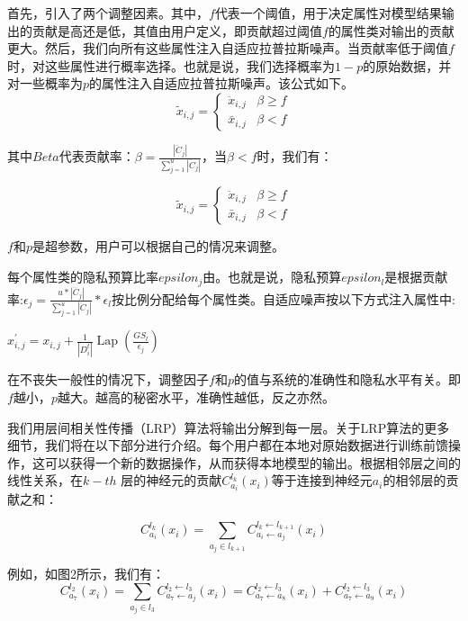 首先，引入了两个调整因素。其中，$f$代表一个阈值，用于决定属性对模型结果输出的贡献是高还是低，其值由用户定义，即贡献超过阈值$f$的属性类对输出的贡献更大。然后，我们向所有这些属性注入自适应拉普拉斯噪声。当贡献率低于阈值$f$时，对这些属性进行概率选择。也就是说，我们选择概率为$1-p$的原始数据，并对一些概率为$p$的属性注入自适应拉普拉斯噪声。该公式如下。
$$
\tilde{x}_{i, j}=\left\{\begin{array}{ll}
\ddot{x}_{i, j} & \beta \geq f \\
\bar{x}_{i, j} & \beta<f
\end{array}\right.
$$

其中$Beta$代表贡献率：$\beta=\frac{\left|\ddot{C}_{j}\right|}{\sum_{j=1}^{u}\left|\ddot{C}_{j}\right|}$，当$\beta<f$时，我们有：

$$\tilde{x}_{i, j}=\left\{\begin{array}{ll}\ddot{x}_{i, j} & \beta \geq f \\ \bar{x}_{i, j} & \beta<f\end{array}\right.$$


$f$和$p$是超参数，用户可以根据自己的情况来调整。

每个属性类的隐私预算比率$epsilon_{j}$由。也就是说，隐私预算$epsilon_{l}$是根据贡献率:$\epsilon_{j}=\frac{u *\left|\ddot{C}_{j}\right|}{\sum_{j=1}^{u}\left|\ddot{C}_{j}\right|} * \epsilon_{l}$按比例分配给每个属性类。自适应噪声按以下方式注入属性中:

$x_{i, j}^{\prime}=x_{i, j}+\frac{1}{\left|D_{i}^{t}\right|} \operatorname{Lap}\left(\frac{G S_{l}}{\epsilon_{j}}\right)$

在不丧失一般性的情况下，调整因子$f$和$p$的值与系统的准确性和隐私水平有关。即$f$越小，$p$越大。越高的秘密水平，准确性越低，反之亦然。

我们用层间相关性传播（LRP）算法将输出分解到每一层。关于LRP算法的更多细节，我们将在以下部分进行介绍。每个用户都在本地对原始数据进行训练前馈操作，这可以获得一个新的数据操作，从而获得本地模型的输出。根据相邻层之间的线性关系，在$k-t h$ 层的神经元的贡献$C_{a_{i}}^{l_{k}}\left(x_{i}\right)$等于连接到神经元$a_{i}$的相邻层的贡献之和：

$$
C_{a_{i}}^{l_{k}}\left(x_{i}\right)=\sum_{a_{j} \in l_{k+1}} C_{a_{i} \leftarrow a_{j}}^{l_{k} \leftarrow l_{k+1}}\left(x_{i}\right)
$$


例如，如图2所示，我们有：
$$
C_{a_{7}}^{l_{2}}\left(x_{i}\right)=\sum_{a_{j} \in l_{3}} C_{a_{7} \leftarrow a_{j}}^{l_{2} \leftarrow l_{3}}\left(x_{i}\right)=C_{a_{7} \leftarrow a_{8}}^{l_{2} \leftarrow l_{3}}\left(x_{i}\right)+C_{a_{7} \leftarrow a_{9}}^{l_{2} \leftarrow l_{3}}\left(x_{i}\right)
$$

